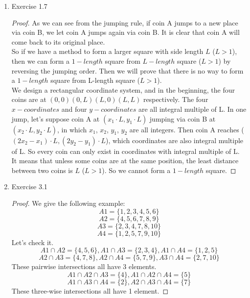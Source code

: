 \documentclass[12pt,a4paper]{article}
\theoremstyle{definition}
\begin{document}
\begin{enumerate}
		\item
		Exercise 1.7
		\begin{proof}
			As we can see from the jumping rule, if coin A jumps to a new place via coin B, we let coin A jumps again via coin B. It is clear that coin A will come back to its original place.\\
			So if we have a method to form a larger square with side length $L$ ($L>1$), then we can form a $1-length$ square from $L-length$ square ($L>1$) by reversing the jumping order. Then we will prove that there is no way to form a $1-length$ square from L-length square ($L>1$).\\
			We design a rectangular coordinate system, and in the beginning, the four coins are at $(0,0) (0,L) (L,0) (L,L)$ respectively. The four $x-coordinates$ and four $y-coordinates$ are all integral multiple of L. In one jump, let's suppose coin A at $(x_1 \cdot L,y_1 \cdot L)$ jumping via coin B at $(x_2 \cdot L,y_2 \cdot L)$, in which $x_1$, $x_2$, $y_1$, $y_2$ are all integers. Then coin A reaches ($(2 x_2-x_1)\cdot L,(2 y_2 - y_1)\cdot L$), which coordinates are also integral multiple of L. So every coin can only exist in coordinates with integral multiple of L. It means that unless some coins are at the same position, the least distance between two coins is $L$ ($L>1$). So we cannot form a $1-length$ square.
		\end{proof}
		
		\item
		Exercise 3.1
		\begin{proof}
			We give the following example:
			$$A1=\{1,2,3,4,5,6\}$$
			$$A2=\{4,5,6,7,8,9\}$$
			$$A3=\{2,3,4,7,8,10\}$$
			$$A4=\{1,2,5,7,9,10\}$$
			Let's check it.
			$$A1 \cap A2=\{4,5,6\}	, A1 \cap A3=\{2,3,4\} ,	A1 \cap A4=\{1,2,5\}$$
			$$A2 \cap A3=\{4,7,8\}	, A2 \cap A4=\{5,7,9\} ,	A3 \cap A4=\{2,7,10\}$$
			These pairwise intersections all have 3 elements.
			$$A1 \cap A2 \cap A3=\{4\}	, A1 \cap A2 \cap A4=\{5\}$$
			$$A1 \cap A3 \cap A4=\{2\}	, A2 \cap A3 \cap A4=\{7\}$$
			These three-wise intersections all have 1 element.
		\end{proof}
		

\end{enumerate}
\end{document}
